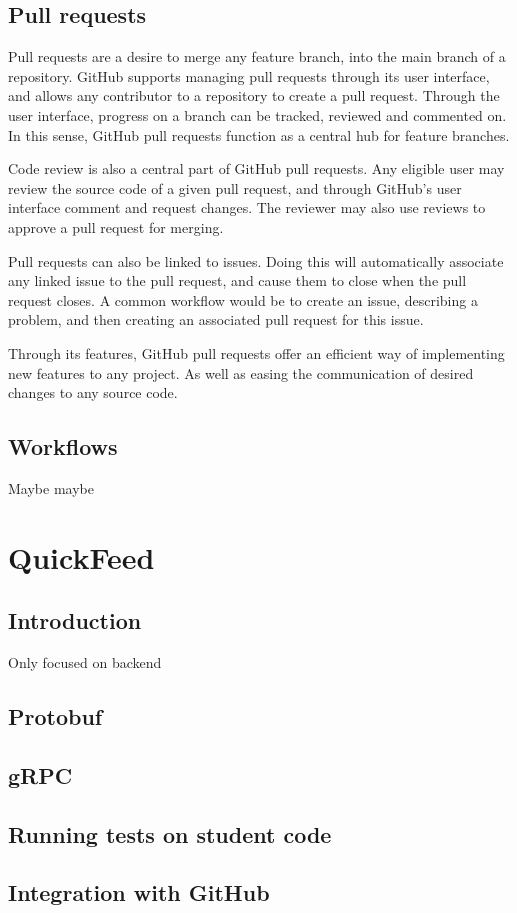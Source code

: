 \subsection{Pull requests}

Pull requests are a desire to merge any feature branch, into the main branch of a repository.
GitHub supports managing pull requests through its user interface, and allows any contributor to a repository to create a pull request.
Through the user interface, progress on a branch can be tracked, reviewed and commented on.
In this sense, GitHub pull requests function as a central hub for feature branches.

Code review is also a central part of GitHub pull requests.
Any eligible user may review the source code of a given pull request, and through GitHub's user interface comment and request changes.
The reviewer may also use reviews to approve a pull request for merging.

Pull requests can also be linked to issues.
Doing this will automatically associate any linked issue to the pull request, and cause them to close when the pull request closes.
A common workflow would be to create an issue, describing a problem, and then creating an associated pull request for this issue.

Through its features, GitHub pull requests offer an efficient way of implementing new features to any project.
As well as easing the communication of desired changes to any source code.

\subsection{Workflows}

Maybe maybe

\section{QuickFeed}

\subsection{Introduction}
Only focused on backend

\subsection{Protobuf}

\subsection{gRPC}

\subsection{Running tests on student code}

\subsection{Integration with GitHub}

